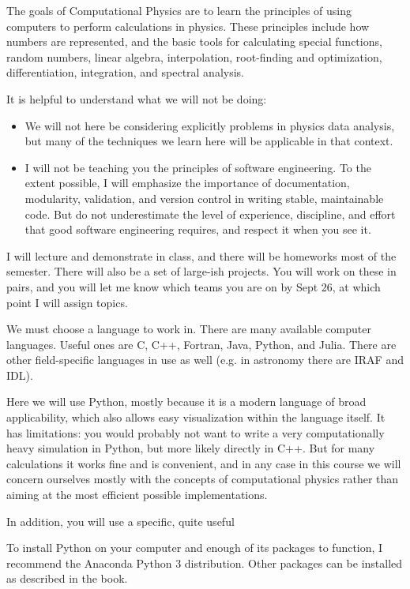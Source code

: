 The goals of Computational Physics are to learn the principles of
using computers to perform calculations in physics. These principles
include how numbers are represented, and the basic tools for
calculating special functions, random numbers, linear algebra,
interpolation, root-finding and optimization, differentiation, 
integration, and spectral analysis.

It is helpful to understand what we will not be doing:
\begin{itemize}
\item We will not here be considering explicitly problems in physics
  data analysis, but many of the techniques we learn here will be
  applicable in that context.
\item I will not be teaching you the principles of software
  engineering. To the extent possible, I will emphasize the importance
  of documentation, modularity, validation, and version control in
  writing stable, maintainable code. But do not underestimate the
  level of experience, discipline, and effort that good software
  engineering requires, and respect it when you see it.
\end{itemize}

I will lecture and demonstrate in class, and there will be homeworks
most of the semester. There will also be a set of large-ish
projects. You will work on these in pairs, and you will let me know
which teams you are on by Sept 26, at which point I will assign
topics.

We must choose a language to work in. There are many available
computer languages. Useful ones are C, C++, Fortran, Java, Python, and
Julia. There are other field-specific languages in use as well
(e.g. in astronomy there are IRAF and IDL).

Here we will use Python, mostly because it is a modern language of
broad applicability, which also allows easy visualization within the
language itself. It has limitations: you would probably not want to
write a very computationally heavy simulation in Python, but more
likely directly in C++. But for many calculations it works fine and is
convenient, and in any case in this course we will concern ourselves
mostly with the concepts of computational physics rather than aiming
at the most efficient possible implementations.

In addition, you will use a specific, quite useful 

To install Python on your computer and enough of its packages to
function, I recommend the Anaconda Python 3 distribution. Other
packages can be installed as described in the book. 

